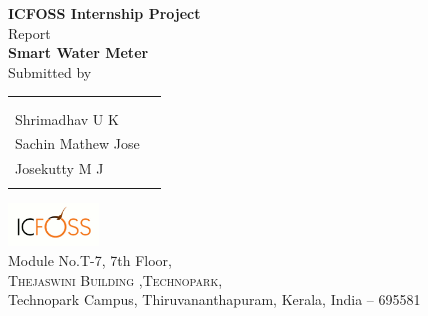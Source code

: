 \begin{titlepage}

\begin{center}

\textup{\small {\bf ICFOSS Internship Project} \\ Report}\\[0.2in]

\Large \textbf {Smart Water Meter}\\[0.5in]



\normalsize Submitted by \\
\begin{table}[h]
\centering
\begin{tabular}{lr}\hline \\
\\
Shrimadhav U K \\
Sachin Mathew Jose \\ 
Josekutty M J \\ \\ \hline 
\end{tabular}
\end{table}

\vspace{.1in}

\vfill

\includegraphics[width=0.18\textwidth]{./logo}\\[0.1in]
\Large{Module No.T-7, 7th Floor,}\\
\normalsize
\textsc{Thejaswini Building ,Technopark,}\\
Technopark Campus, Thiruvananthapuram, Kerala, India -- 695581 \\
\vspace{0.2cm}

  

\end{center}

\end{titlepage}
